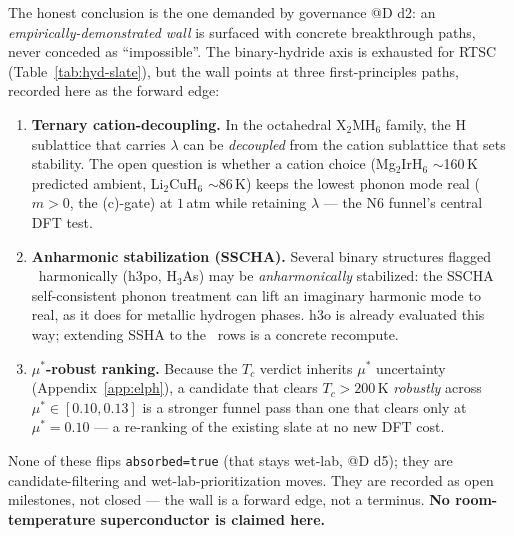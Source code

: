 The honest conclusion is the one demanded by governance @D d2: an
\emph{empirically-demonstrated wall} is surfaced with concrete breakthrough
paths, never conceded as ``impossible''. The binary-hydride axis is
exhausted for RTSC (Table~\ref{tab:hyd-slate}), but the wall points at
three first-principles paths, recorded here as the forward edge:
\begin{enumerate}\itemsep0.25em
\item \textbf{Ternary cation-decoupling.} In the octahedral X$_2$MH$_6$
  family, the H sublattice that carries $\lambda$ can be \emph{decoupled}
  from the cation sublattice that sets stability. The open question is
  whether a cation choice (Mg$_2$IrH$_6$ $\sim$160\,K predicted ambient,
  Li$_2$CuH$_6$ $\sim$86\,K) keeps the lowest phonon mode real
  ($m\!>\!0$, the (c)-gate) at $1$\,atm while retaining $\lambda$ ---
  the N6 funnel's central DFT test.
\item \textbf{Anharmonic stabilization (SSCHA).} Several binary structures
  flagged \tierRed\ harmonically (h3po, H$_3$As) may be
  \emph{anharmonically} stabilized: the SSCHA self-consistent phonon
  treatment can lift an imaginary harmonic mode to real, as it does for
  metallic hydrogen phases. h3o is already evaluated this way; extending
  SSHA to the \tierRed\ rows is a concrete recompute.
\item \textbf{$\mu^{*}$-robust ranking.} Because the $T_c$ verdict inherits
  $\mu^{*}$ uncertainty (Appendix~\ref{app:elph}), a candidate that clears
  $T_c\!>\!200$\,K \emph{robustly} across $\mu^{*}\!\in\![0.10,0.13]$ is a
  stronger funnel pass than one that clears only at $\mu^{*}=0.10$ ---
  a re-ranking of the existing slate at no new DFT cost.
\end{enumerate}
None of these flips \texttt{absorbed=true} (that stays wet-lab, @D d5); they
are candidate-filtering and wet-lab-prioritization moves. They are recorded
as open milestones, not closed --- the wall is a forward edge, not a
terminus. \textbf{No room-temperature superconductor is claimed here.}
